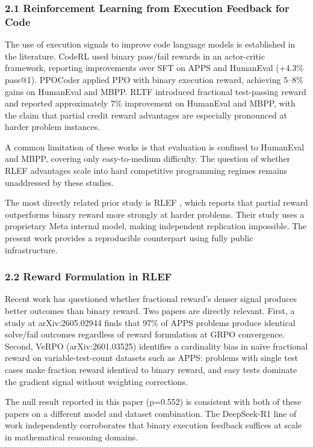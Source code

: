
\subsubsection{2.1 Reinforcement Learning from Execution Feedback for Code}

The use of execution signals to improve code language models is established in the literature. CodeRL \citep{Le2022CodeRL} used binary pass/fail rewards in an actor-critic framework, reporting improvements over SFT on APPS and HumanEval (+4.3\% pass@1). PPOCoder \citep{Majeed2023} applied PPO with binary execution reward, achieving 5--8\% gains on HumanEval and MBPP. RLTF \citep{Liu2023RLTF} introduced fractional test-passing reward and reported approximately 7\% improvement on HumanEval and MBPP, with the claim that partial credit reward advantages are especially pronounced at harder problem instances.

A common limitation of these works is that evaluation is confined to HumanEval and MBPP, covering only easy-to-medium difficulty. The question of whether RLEF advantages scale into hard competitive programming regimes remains unaddressed by these studies.

The most directly related prior study is RLEF \citep{Gehring2024RLEF}, which reports that partial reward outperforms binary reward more strongly at harder problems. Their study uses a proprietary Meta internal model, making independent replication impossible. The present work provides a reproducible counterpart using fully public infrastructure.

\subsubsection{2.2 Reward Formulation in RLEF}

Recent work has questioned whether fractional reward's denser signal produces better outcomes than binary reward. Two papers are directly relevant. First, a study at arXiv:2605.02944 finds that 97\% of APPS problems produce identical solve/fail outcomes regardless of reward formulation at GRPO convergence. Second, VeRPO (arXiv:2601.03525) identifies a cardinality bias in naïve fractional reward on variable-test-count datasets such as APPS: problems with single test cases make fraction reward identical to binary reward, and easy tests dominate the gradient signal without weighting corrections.

The null result reported in this paper (p=0.552) is consistent with both of these papers on a different model and dataset combination. The DeepSeek-R1 line of work \citep{DeepSeekAI2025R1} independently corroborates that binary execution feedback suffices at scale in mathematical reasoning domains.


